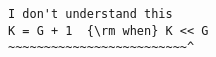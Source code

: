 \begin{verbatim}
I don't understand this
K = G + 1  {\rm when} K << G
~~~~~~~~~~~~~~~~~~~~~~~~~^
\end{verbatim}
